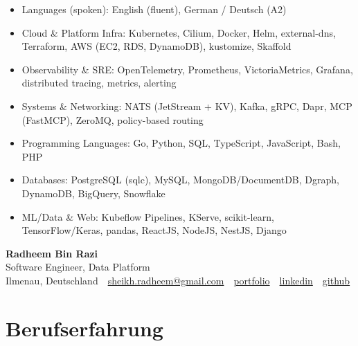 \documentclass[10pt,a4paper]{resume}
\makeatletter
\newcommand{\Portfolio}{https://radheem.github.io/my-cv}
\newcommand{\PortfolioText}{portfolio}
\newcommand{\GitHub}{https://github.com/radheem}
\newcommand{\LinkedIn}{https://www.linkedin.com/in/radheem-razi}
\newcommand{\Email}{sheikh.radheem@gmail.com}
\makeatother
\begin{document}
\begin{itemize}[leftmargin=1.4em,nosep,topsep=2pt]
  \item Languages (spoken): English (fluent), German / Deutsch (A2)
  \item Cloud \& Platform Infra: Kubernetes, Cilium, Docker, Helm, external-dns, Terraform, AWS (EC2, RDS, DynamoDB), kustomize, Skaffold
  \item Observability \& SRE: OpenTelemetry, Prometheus, VictoriaMetrics, Grafana, distributed tracing, metrics, alerting
  \item Systems \& Networking: NATS (JetStream + KV), Kafka, gRPC, Dapr, MCP (FastMCP), ZeroMQ, policy-based routing
  \item Programming Languages: Go, Python, SQL, TypeScript, JavaScript, Bash, PHP
  \item Databases: PostgreSQL (sqlc), MySQL, MongoDB/DocumentDB, Dgraph, DynamoDB, BigQuery, Snowflake
  \item ML/Data \& Web: Kubeflow Pipelines, KServe, scikit-learn, TensorFlow/Keras, pandas, ReactJS, NodeJS, NestJS, Django
\end{itemize}

\clearpage
{}

\begin{center}
  {\huge\bfseries Radheem Bin Razi}\\[3pt]
  {\large Software Engineer, Data Platform}\\[6pt]
  \small
  Ilmenau, Deutschland \,\textbar\,
  \href{mailto:\Email}{\Email} \,\textbar\,
  \href{\Portfolio}{\PortfolioText} \,\textbar\,
  \href{\LinkedIn}{linkedin} \,\textbar\,
  \href{\GitHub}{github}
\end{center}
\vspace{2pt}

\section{Berufserfahrung}
\end{document}
